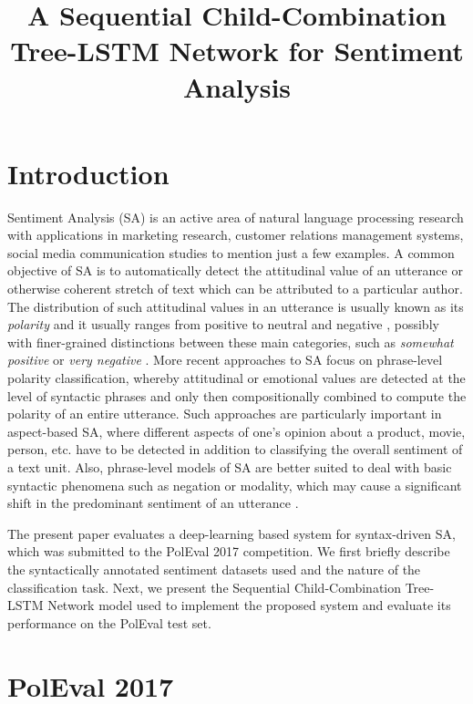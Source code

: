 \documentclass[10pt, a4paper]{article}
\title{A Sequential Child-Combination Tree-LSTM Network for Sentiment Analysis}
\begin{document}
\maketitleabstract

\section{Introduction}   
Sentiment Analysis (SA) is an active area of natural language processing research with applications in marketing research, customer relations management systems, social media communication studies to mention just a few examples. A common objective of SA is to automatically detect the attitudinal value of an utterance or otherwise coherent stretch of text which can be attributed to a particular author. The distribution of  such attitudinal values in an utterance is usually known as its \textit{polarity} and it usually ranges from positive to neutral and negative \cite{cambria_schuller}, possibly with finer-grained distinctions between these main categories, such as \textit{somewhat positive} or \textit{very negative} \cite{socher2013recursive}. More recent approaches to SA focus on phrase-level polarity classification, whereby attitudinal or emotional values are detected at the level of syntactic phrases and only then compositionally combined to compute the polarity of an entire utterance. Such approaches are particularly important in aspect-based SA, where different aspects of one's opinion about a product, movie, person, etc. have to be detected in addition to  classifying the overall sentiment of a text unit. Also, phrase-level models of SA are better suited to deal with basic syntactic phenomena such as negation or modality, which may cause a significant shift in the predominant sentiment of an utterance \cite{wilson_wiebe}. 
\par The present paper evaluates a deep-learning based system for syntax-driven SA, which was submitted to the PolEval 2017 competition. We first briefly describe the syntactically annotated sentiment datasets used and the nature of the classification task. Next, we present the Sequential Child-Combination Tree-LSTM Network model used to implement the proposed system and evaluate its performance on the PolEval test set.


\section{PolEval 2017}
\end{document}
